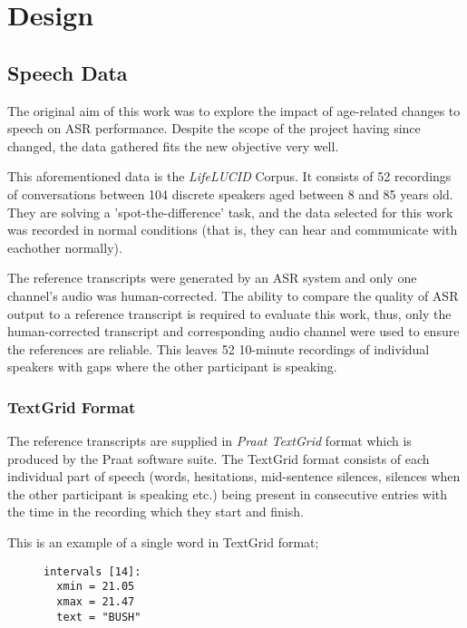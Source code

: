 \chapter{Design}\label{ch:design}

\section{Speech Data}

The original aim of this work was to explore the impact of age-related changes to speech on ASR performance.
Despite the scope of the project having since changed, the data gathered fits the new objective very well.

This aforementioned data is the \emph{LifeLUCID} Corpus\cite{lifelucid}.
It consists of 52 recordings of conversations between 104 discrete speakers aged between 8 and 85 years old.
They are solving a 'spot-the-difference' task, and the data selected for this work was recorded in normal conditions (that is, they can hear and communicate with eachother normally).

The reference transcripts were generated by an ASR system and only one channel's audio was human-corrected.
The ability to compare the quality of ASR output to a reference transcript is required to evaluate this work, thus, only the human-corrected transcript and corresponding audio channel were used to ensure the references are reliable.
This leaves 52 10-minute recordings of individual speakers with gaps where the other participant is speaking.

\subsection{TextGrid Format}

The reference transcripts are supplied in \emph{Praat TextGrid} format which is produced by the Praat software suite\cite{praat}.
The TextGrid format consists of each individual part of speech (words, hesitations, mid-sentence silences, silences when the other participant is speaking etc.) being present in consecutive entries with the time in the recording which they start and finish.

This is an example of a single word in TextGrid format;

\begin{figure}[h!]
\centering
\begin{BVerbatim}
intervals [14]:
  xmin = 21.05 
  xmax = 21.47 
  text = "BUSH" 
\end{BVerbatim}
\end{figure}

